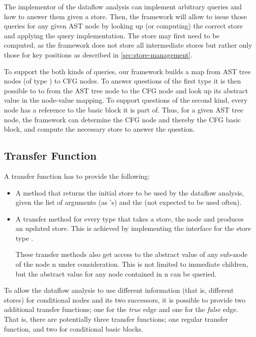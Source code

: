 The implementor
of the dataflow analysis can implement arbitrary queries and how to answer them
given a store. Then, the framework will allow to issue those queries for
any given AST node by looking up (or computing) the correct store and applying the query
implementation.
The store may first need to be computed, as the framework does not store all intermediate
stores but rather only those for key positions as described in \autoref{sec:store-management}.

To support the both kinds of queries, our framework builds a map from AST tree nodes (of type
) to CFG nodes.  To answer questions of the first type it is
then possible to to from the AST tree node to the CFG node and look up its abstract value in
the node-value mapping.  To support questions of the second kind, every node has a reference
to the basic block it is part of. Thus, for a given AST tree node, the framework
can determine the CFG node and thereby the CFG basic block, and compute the necessary store
to answer the question.





\subsection{Transfer Function}
\label{sec:transfer-fnc}

A transfer function has to provide the following:
\begin{itemize}
\item A method that returns the initial store to be used by the dataflow analysis, given
the list of arguments (as 's) and the  (not expected to be used often).
\item A transfer method for every  type that takes a store, the node and produces
an updated store. This is achieved by implementing the  interface
for the store type .

These transfer methods also get access to the abstract value of any sub-node of the node \code n
under consideration.  This is not limited to immediate children, but the abstract value for any node contained
in \code n can be queried.
\end{itemize}

To allow the dataflow analysis to use different information (that is, different stores)
for conditional nodes and its two successors, it is possible to provide two additional
transfer functions; one for the \emph{true} edge and one for the \emph{false} edge.
That is, there are potentially three transfer functions; one regular transfer function, and two
for conditional basic blocks.


